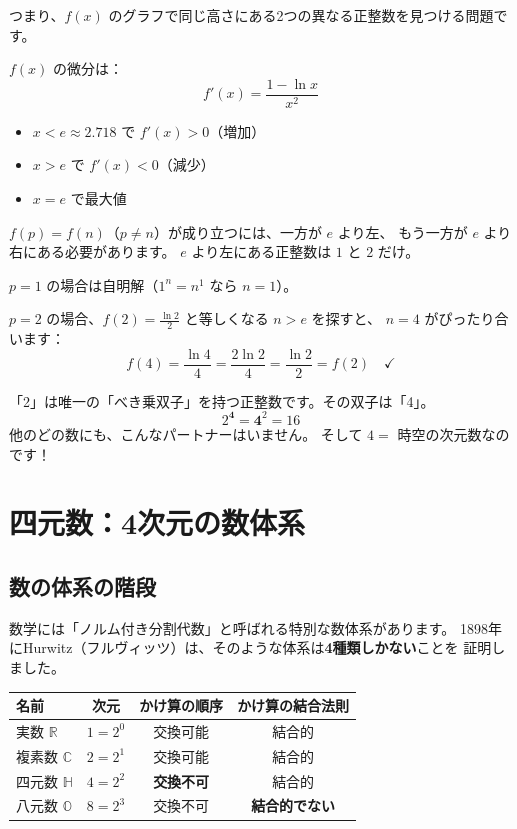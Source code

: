 \documentclass[12pt,a4paper]{article}
\begin{document}
つまり、$f(x)$ のグラフで同じ高さにある2つの異なる正整数を見つける問題です。

$f(x)$ の微分は：
\[
  f'(x) = \frac{1 - \ln x}{x^2}
\]
\begin{itemize}
  \item $x < e \approx 2.718$ で $f'(x) > 0$（増加）
  \item $x > e$ で $f'(x) < 0$（減少）
  \item $x = e$ で最大値
\end{itemize}

$f(p) = f(n)$（$p \neq n$）が成り立つには、一方が $e$ より左、
もう一方が $e$ より右にある必要があります。
$e$ より左にある正整数は $1$ と $2$ だけ。

$p = 1$ の場合は自明解（$1^n = n^1$ なら $n=1$）。

$p = 2$ の場合、$f(2) = \frac{\ln 2}{2}$ と等しくなる $n > e$ を探すと、
$n = 4$ がぴったり合います：
\[
  f(4) = \frac{\ln 4}{4} = \frac{2\ln 2}{4} = \frac{\ln 2}{2} = f(2) \quad \checkmark
\]

\begin{funfact}[べき乗双子]
「2」は唯一の「べき乗双子」を持つ正整数です。その双子は「4」。
\[
  2^{\mathbf{4}} = \mathbf{4}^2 = 16
\]
他のどの数にも、こんなパートナーはいません。
そして $4 = $ 時空の次元数なのです！
\end{funfact}

\section{四元数：4次元の数体系}

\subsection{数の体系の階段}

数学には「ノルム付き分割代数」と呼ばれる特別な数体系があります。
1898年にHurwitz（フルヴィッツ）は、そのような体系は\textbf{4種類しかない}ことを
証明しました。

\begin{center}
\renewcommand{\arraystretch}{1.3}
\begin{tabular}{lccc}
\toprule
\textbf{名前} & \textbf{次元} & \textbf{かけ算の順序} & \textbf{かけ算の結合法則} \\
\midrule
実数 $\mathbb{R}$ & $1 = 2^0$ & 交換可能 & 結合的 \\
複素数 $\mathbb{C}$ & $2 = 2^1$ & 交換可能 & 結合的 \\
四元数 $\mathbb{H}$ & $4 = 2^2$ & \textbf{交換不可} & 結合的 \\
八元数 $\mathbb{O}$ & $8 = 2^3$ & 交換不可 & \textbf{結合的でない} \\
\bottomrule
\end{tabular}
\end{center}
\end{document}

